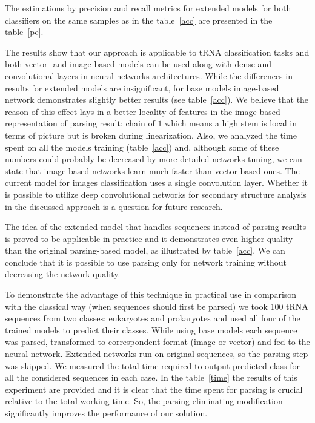 \documentclass[runningheads]{llncs}
\begin{document}


The estimations by precision and recall metrics for extended models for both classifiers on the same samples as in the  table~\ref{acc} are presented in the table~\ref{pe}.



The results show that our approach is applicable to tRNA classification tasks and both vector- and image-based models can be used along with dense and convolutional layers in neural networks architectures.
While the differences in results for extended models are insignificant, for base models image-based network demonstrates slightly better results (see table~\ref{acc}).
We believe that the reason of this effect lays in a better locality of features in the image-based representation of parsing result: chain of $1$ which means a high stem is local in terms of picture but is broken during linearization. 
Also, we analyzed the time spent on all the models training (table~\ref{acc}) and, although some of these numbers could probably be decreased by more detailed networks tuning, we can state that image-based networks learn much faster than vector-based ones.
The current model for images classification uses a single convolution layer.
Whether it is possible to utilize deep convolutional networks for secondary structure analysis in the discussed approach is a question for future research.

The idea of the extended model that handles sequences instead of parsing results is proved to be applicable in practice and it demonstrates even higher quality than the original parsing-based model, as illustrated by table~\ref{acc}.
We can conclude that it is possible to use parsing only for network training without decreasing the network quality.

To demonstrate the advantage of this technique in practical use 
in comparison with the classical way (when sequences should first be parsed) we took 100 tRNA sequences from two classes: eukaryotes and prokaryotes and used all four of the trained models to predict their classes. While using base models each sequence was parsed, transformed to correspondent format (image or vector) and fed to the neural network. Extended networks run on original sequences, so the parsing step was skipped. We measured the total time required to output predicted class for all the considered sequences in each case. In the table~\ref{time} the results of this experiment are provided and it is clear that the time spent for parsing is crucial relative to the total working time. So, the parsing eliminating modification significantly improves the performance of our solution.
\end{document}
